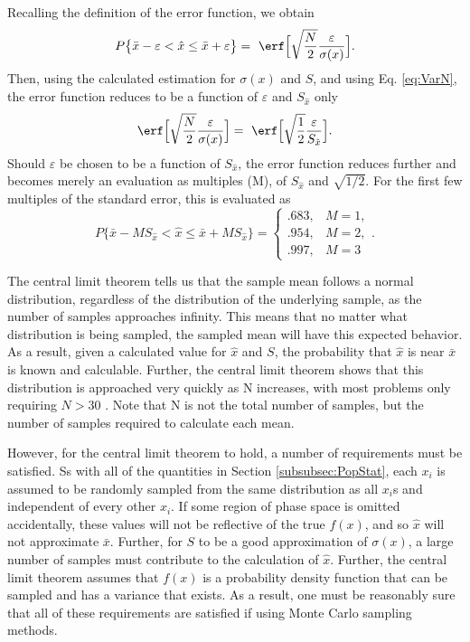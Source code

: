 Recalling the definition of the error function, we obtain
\begin{equation}
  P\big\{\bar{x} - \varepsilon < \hat{x} \leq \bar{x} + \varepsilon\big\} = \
    \erf\Big[\sqrt{\frac{N}{2}} \frac{\varepsilon}{\sigma(x)}\Big].
\end{equation}
Then, using the calculated estimation for $\sigma(x)$ and $S$, and using Eq.
\eqref{eq:VarN}, the error function reduces to be
a function of $\varepsilon$ and $S_{\hat{x}}$ only
\begin{equation}
    \erf\Big[\sqrt{\frac{N}{2}} \frac{\varepsilon}{\sigma(x)}\Big] = \
    \erf\Big[\sqrt{\frac{1}{2}} \frac{\varepsilon}{S_{\hat{x}}}\Big] .
\end{equation}
Should $\varepsilon$ be chosen to be a function of $S_{\hat{x}}$, the error
function reduces further and becomes merely an evaluation as multiples (M), of
$S_{\hat{x}}$ and $\sqrt{1/2}$. For the first few multiples of the standard
error, this is evaluated as
\begin{equation}
  P\big\{\bar{x} - M S_{\hat{x}} < \hat{x} \leq \bar{x} + M S_{\hat{x}} \big\} =
  \begin{cases}
    .683, & M = 1, \\
    .954, & M = 2, \\
    .997, & M = 3
  \end{cases}  .
\end{equation}

The central limit theorem tells us that the sample mean follows a normal
distribution, regardless of the distribution of the underlying sample, as the
number of samples approaches infinity. This
means that no matter what distribution is being sampled, the sampled mean will
have this expected behavior. As a result, given a calculated value for
$\hat{x}$ and $S$, the probability that $\hat{x}$ is near $\bar{x}$ is known
and calculable.
Further, the central limit theorem shows that this distribution is approached
very quickly as N increases, with most problems only requiring $N > 30$
\cite{lewis_computational_1984}. Note
that N is not the total number of samples, but the number of samples required to
calculate each mean.

However, for the central limit theorem to hold, a number of
requirements must be satisfied. Ss with all of the quantities in Section
\ref{subsubsec:PopStat},
 each $x_i$ is assumed to be randomly sampled from the same distribution as all $x_i$s and
independent of every other $x_i$. If some region of phase space is omitted
accidentally, these values will not be reflective of the true $f(x)$, and so
$\hat{x}$ will not approximate $\bar{x}$. Further, for $S$ to be a
good approximation of $\sigma(x)$, a large number of samples must contribute
to the calculation of $\hat{x}$. Further, the central limit theorem assumes that
$f(x)$ is a probability density function that can be sampled and has a variance
that exists. As a result, one must be reasonably sure that all of these
requirements are satisfied if using Monte Carlo sampling methods.


